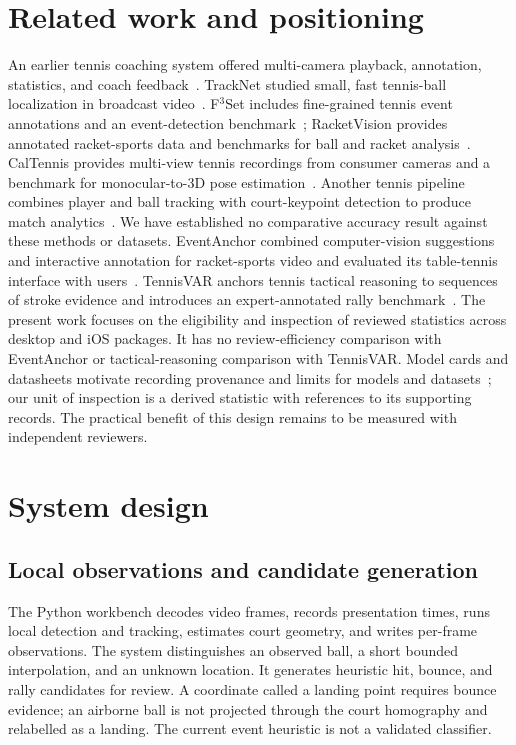 \documentclass[10pt]{article}
\begin{document}
\section{Related work and positioning}
An earlier tennis coaching system offered multi-camera playback, annotation, statistics, and coach feedback~\cite{kelly}. TrackNet studied small, fast tennis-ball localization in broadcast video~\cite{tracknet}. F$^3$Set includes fine-grained tennis event annotations and an event-detection benchmark~\cite{f3set}; RacketVision provides annotated racket-sports data and benchmarks for ball and racket analysis~\cite{racketvision}. CalTennis provides multi-view tennis recordings from consumer cameras and a benchmark for monocular-to-3D pose estimation~\cite{caltennis}. Another tennis pipeline combines player and ball tracking with court-keypoint detection to produce match analytics~\cite{desu}. We have established no comparative accuracy result against these methods or datasets. EventAnchor combined computer-vision suggestions and interactive annotation for racket-sports video and evaluated its table-tennis interface with users~\cite{eventanchor}. TennisVAR anchors tennis tactical reasoning to sequences of stroke evidence and introduces an expert-annotated rally benchmark~\cite{tennisvar}. The present work focuses on the eligibility and inspection of reviewed statistics across desktop and iOS packages. It has no review-efficiency comparison with EventAnchor or tactical-reasoning comparison with TennisVAR. Model cards and datasheets motivate recording provenance and limits for models and datasets~\cite{modelcards,datasheets}; our unit of inspection is a derived statistic with references to its supporting records. The practical benefit of this design remains to be measured with independent reviewers.

\section{System design}
\subsection{Local observations and candidate generation}
The Python workbench decodes video frames, records presentation times, runs local detection and tracking, estimates court geometry, and writes per-frame observations. The system distinguishes an observed ball, a short bounded interpolation, and an unknown location. It generates heuristic hit, bounce, and rally candidates for review. A coordinate called a landing point requires bounce evidence; an airborne ball is not projected through the court homography and relabelled as a landing. The current event heuristic is not a validated classifier.
\end{document}
